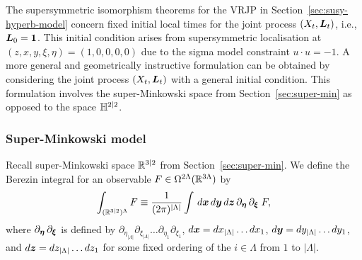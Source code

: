 \documentclass[11pt,a4paper]{article}
\begin{document}
The supersymmetric isomorphism theorems for the VRJP in
Section~\ref{sec:susy-hyperb-model} concern fixed initial local times for the joint
process $(X_t,\boldsymbol{L}_t)$, i.e., $\boldsymbol{L}_0=\boldsymbol{1}$.
This initial condition arises from supersymmetric localisation at 
$(z,x,y,\xi,\eta)=(1,0,0,0,0)$ due to the sigma model constraint
$u\cdot u =-1$.  A more general and geometrically instructive
formulation can be obtained by considering the joint process
$(X_t, \boldsymbol{L}_t)$ with a general initial condition. This
formulation involves the super-Minkowski space from
Section~\ref{sec:super-min} as opposed to the space $\mathbb{H}^{2|2}$. 

\subsubsection{Super-Minkowski model}

Recall super-Minkowski space $\mathbb{R}^{3|2}$ from
Section~\ref{sec:super-min}.  We define the Berezin integral for an
observable $F \in \Omega^{2\Lambda}(\mathbb{R}^{3\Lambda})$ by
\begin{equation}
\label{eq:R32int}
\int_{(\mathbb{R}^{3|2})^{\Lambda}}F \equiv \frac{1}{(2\pi)^{|\Lambda|}} \int\, d\boldsymbol{x}\,d\boldsymbol{y}\,d\boldsymbol{z}\, \partial_{\boldsymbol{\eta}}\,\partial_{\boldsymbol{\xi}}\;F,
\end{equation}
where $\partial_{\boldsymbol{\eta}}\, \partial_{\boldsymbol{\xi}}$ is defined by
$\partial_{\eta_{|\Lambda|}}\partial_{\xi_{|\Lambda|}}\dots \partial_{\eta_{1}}\partial_{\xi_{1}}$,
$d\boldsymbol{x} = dx_{|\Lambda|}\dots dx_{1}$,
$d\boldsymbol{y}=dy_{|\Lambda|}\dots dy_{1}$, and
$d\boldsymbol{z}=dz_{|\Lambda|}\dots dz_{1}$ for some fixed ordering of the
$i\in\Lambda$ from $1$ to $|\Lambda|$.
\end{document}
